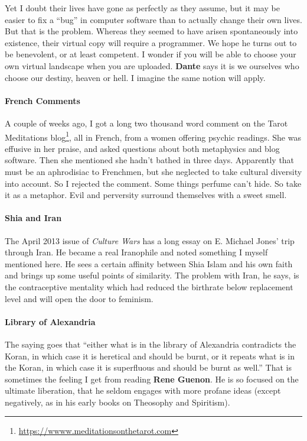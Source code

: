 Yet I doubt their lives have gone as perfectly as they assume, but it may be easier to fix a ``bug'' in computer software than to actually change their own lives. But that is the problem. Whereas they seemed to have arisen spontaneously into existence, their virtual copy will require a programmer. We hope he turns out to be benevolent, or at least competent. I wonder if you will be able to choose your own virtual landscape when you are uploaded. \textbf{Dante} says it is we ourselves who choose our destiny, heaven or hell. I imagine the same notion will apply.

\paragraph{French Comments}


A couple of weeks ago, I got a long two thousand word comment on the Tarot Meditations blog\footnote{\url{https://wwww.meditationsonthetarot.com}}, all in French, from a women offering psychic readings. She was effusive in her praise, and asked questions about both metaphysics and blog software. Then she mentioned she hadn't bathed in three days. Apparently that must be an aphrodisiac to Frenchmen, but she neglected to take cultural diversity into account. So I rejected the comment. Some things perfume can't hide. So take it as a metaphor. Evil and perversity surround themselves with a sweet smell.

\paragraph{Shia and Iran}


The April 2013 issue of \emph{Culture Wars} has a long essay on E. Michael Jones' trip through Iran. He became a real Iranophile and noted something I myself mentioned here. He sees a certain affinity between Shia Islam and his own faith and brings up some useful points of similarity. The problem with Iran, he says, is the contraceptive mentality which had reduced the birthrate below replacement level and will open the door to feminism.

\paragraph{Library of Alexandria}


The saying goes that ``either what is in the library of Alexandria contradicts the Koran, in which case it is heretical and should be burnt, or it repeats what is in the Koran, in which case it is superfluous and should be burnt as well.'' That is sometimes the feeling I get from reading \textbf{Rene Guenon}. He is so focused on the ultimate liberation, that he seldom engages with more profane ideas (except negatively, as in his early books on Theosophy and Spiritism).

